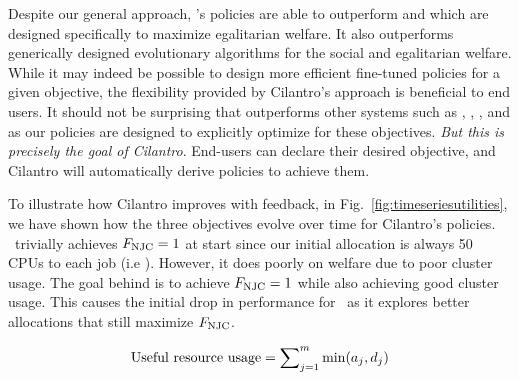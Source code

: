 Despite our general approach, \cilantro's policies are able to
outperform \minerva{} and \greedyew{} which are designed specifically to maximize egalitarian
welfare. It also outperforms generically designed evolutionary algorithms for the social and
egalitarian welfare.
While it may indeed be possible to design more efficient fine-tuned policies for a given objective,
the flexibility provided by Cilantro's approach is beneficial to end users.
It should not be surprising that
\cilantros outperforms other systems such as \ernest, \quasar, \parties, and \AIMD{}
as our policies are designed to explicitly optimize for these objectives.
\emph{But this is precisely the goal of Cilantro}.
End-users can declare their desired objective, and Cilantro will automatically derive
policies to achieve them. 


To illustrate how Cilantro improves with feedback,
in
Fig.~\ref{fig:timeseriesutilities}, we have shown how the three objectives evolve over time for
Cilantro's policies.
\equalshare~trivially achieves $F_{\rm NJC}=1$ at start since our initial allocation
is always 50 CPUs to each job (i.e \equalshare). However, it does poorly on welfare due to poor cluster usage.
The goal behind \cilantronjcs is to achieve $F_{\rm NJC}=1$ while also achieving good cluster usage.
This causes the initial drop in performance for \cilantronjc~as it explores better allocations that still maximize $F_{\rm NJC}$.


\begin{align}
\text{Useful resource usage}
= \sum\nolimits_{j=1}^m \min(a_{j}, d_j)
\label{eqn:effresusage}
\end{align}

